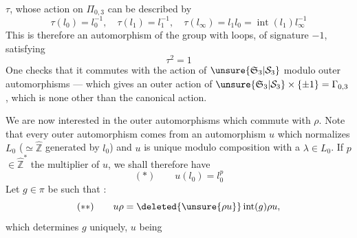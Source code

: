 $\tau$, whose action on $\Pi_{0,3}$ can be described by
\[
\tau(l_0)=l_0^{-1},\quad\tau(l_1)=l_1^{-1},\quad\tau(l_\infty)=l_1l_0=\operatorname{int}(l_1)l_\infty^{-1}
\]
This is therefore an automorphism of the group with loops, of signature $-1$, satisfying
\[
\tau^2=1
\]
One checks that it commutes with the action of $\unsure{\mathfrak S_3|\mathcal S_3}$ modulo outer automorphisms --- which gives an outer action of $\unsure{\mathfrak S_3|\mathcal S_3}\times\{\pm1\}=\Gamma_{0,3}$, which is none other than the canonical action.

We are now interested in the outer automorphisms which commute with $\rho$. Note that every outer automorphism  comes from an automorphism $u$ which normalizes  $L_0$ ($\simeq\hat{\mathbb Z}$ generated by $l_0$) and $u$ is unique modulo composition with a $\lambda\in L_0$. If $p$  $\in\hat{\mathbb Z}^{*}$  the multiplier of $u$, we shall therefore have
\[
(*)\qquad u(l_0)=l_0^p
\]
Let $g\in\pi$ be such that :
\[
(**)\qquad u\rho=\deleted{\unsure{\rho u}}\operatorname{int}(g)\rho u,
\]
which determines $g$ uniquely, $u$ being
